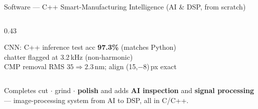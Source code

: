 \documentclass[aspectratio=169,11pt]{beamer}
\begin{document}
\begin{frame}[shrink=10]{Software --- C++ Smart-Manufacturing Intelligence (AI \& DSP, from scratch)}
\begin{columns}[T]
\begin{column}{0.43\textwidth}
      \vspace{0.3em}
      \begin{block}{}
        \footnotesize
        CNN: C++ inference test acc \textcolor{discoblue}{\textbf{97.3\%}}
          (matches Python)\\
        chatter flagged at 3.2\,kHz (non-harmonic)\\
        CMP removal RMS $35 \Rightarrow 2.3$\,nm; align (15,$-8$)\,px exact
      \end{block}
    \end{column}
  \end{columns}
  \vspace{0.2em}
  {\footnotesize\textcolor{discogray}{Completes cut $\cdot$ grind $\cdot$
    \textbf{polish} and adds \textbf{AI inspection} and \textbf{signal
    processing} --- image-processing system from AI to DSP, all in C/C++.}}
\end{frame}
\end{document}
